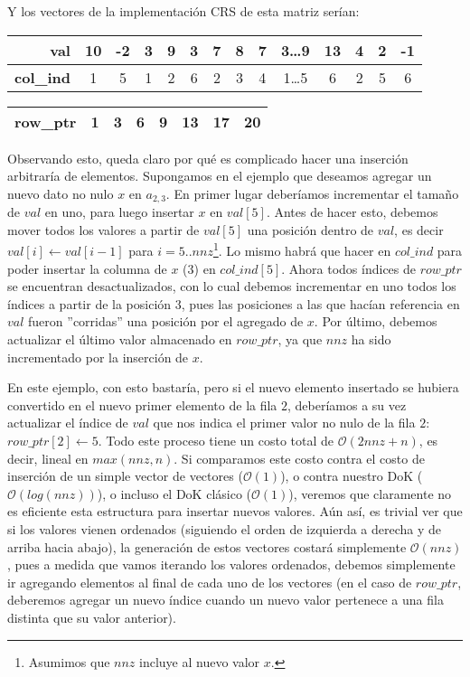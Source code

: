 \par Y los vectores de la implementaci\'on CRS de esta matriz ser\'ian:

\begin{table}[!h]
    \begin{tabular}{|r|c|c|c|c|c|c|c|c|c|c|c|c|c|}
        \hline
        \textbf{val}&10&-2&3&9&3&7&8&7&3\dots 9&13&4&2&-1\\
        \hline
        \textbf{col\_ind}&1&5&1&2&6&2&3&4&1\dots 5&6&2&5&6\\
        \hline
    \end{tabular}
    \begin{tabular}{|r|c|c|c|c|c|c|c|}
        \hline
        \textbf{row\_ptr}&1&3&6&9&13&17&20\\
        \hline
    \end{tabular}
\end{table}
\medskip

\par Observando esto, queda claro por qué es complicado hacer una inserci\'on
arbitrar\'ia de elementos. Supongamos en el ejemplo que deseamos agregar un
nuevo dato no nulo $x$ en $a_{2,3}$. En primer lugar deber\'iamos incrementar el
tama\~no de $val$ en uno, para luego insertar $x$ en $val[5]$. Antes de hacer
esto, debemos mover todos los valores a partir de $val[5]$ una posici\'on dentro
de $val$, es decir $val[i]\gets val[i-1]$ para $i=5..nnz$\footnote{Asumimos que
$nnz$ incluye al nuevo valor $x$.}. Lo mismo habr\'a que hacer en $col\_ind$
para poder insertar la columna de $x$ (3) en $col\_ind[5]$. Ahora todos
\'indices de $row\_ptr$ se encuentran desactualizados, con lo cual debemos
incrementar en uno todos los \'indices a partir de la posici\'on 3, pues las
posiciones a las que hac\'ian referencia en $val$ fueron ''corridas'' una
posici\'on por el agregado de $x$.  Por \'ultimo, debemos actualizar el \'ultimo
valor almacenado en $row\_ptr$, ya que $nnz$ ha sido incrementado por la
inserci\'on de $x$.

\par En este ejemplo, con esto bastar\'ia, pero si el nuevo elemento insertado
se hubiera convertido en el nuevo primer elemento de la fila $2$, deber\'iamos a
su vez actualizar el \'indice de $val$ que nos indica el primer valor no nulo de
la fila $2$: $row\_ptr[2] \gets 5$. Todo este proceso tiene un costo total de
$\mathcal{O}(2nnz+n)$, es decir, lineal en $max(nnz,n)$. Si comparamos este
costo contra el costo de inserci\'on de un simple vector de vectores
($\mathcal{O}(1)$), o contra nuestro DoK ($\mathcal{O}(log(nnz))$), o incluso el
DoK cl\'asico ($\mathcal{O}(1)$), veremos que claramente no es eficiente esta
estructura para insertar nuevos valores. A\'un as\'i, es trivial ver que si los
valores vienen ordenados (siguiendo el orden de izquierda a derecha y de arriba
hacia abajo), la generaci\'on de estos vectores costar\'a simplemente
$\mathcal{O}(nnz)$, pues a medida que vamos iterando los valores ordenados,
debemos simplemente ir agregando elementos al final de cada uno de los vectores
(en el caso de $row\_ptr$, deberemos agregar un nuevo \'indice cuando un nuevo
valor pertenece a una fila distinta que su valor anterior).

